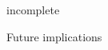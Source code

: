 \documentclass[amt, manuscript]{copernicus}
\newcommand{\todo}[1]{{\color{red} #1}}
\begin{document}
\todo{incomplete}

\todo{Future implications}




 


 










\end{document}
